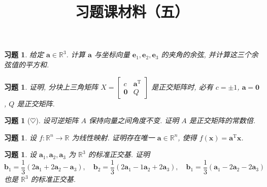 \documentclass[UTF8]{ctexart}
\newtheorem{ex}[thm]{习题}
\begin{document}
\title{习题课材料（五）}
\date{}

\maketitle


\begin{ex}
  给定 \(\boldsymbol{a} \in \mathbb{R}^3\).
  计算 \(\boldsymbol{a}\) 与坐标向量 \(\boldsymbol{e}_1,\boldsymbol{e}_2,\boldsymbol{e}_3\)
  的夹角的余弦, 并计算这三个余弦值的平方和.
\end{ex}



\begin{ex}
  证明, 分块上三角矩阵
  \(X=\begin{bmatrix} c & \boldsymbol{a}^{\mathrm{T}} \\ \boldsymbol{0} & Q\end{bmatrix}\)
  是正交矩阵时, 必有 \(c = \pm 1\), \(\boldsymbol{a} = \boldsymbol{0}\),
  \(Q\) 是正交矩阵.
\end{ex}



\begin{ex}[\(\heartsuit\)]
  设可逆矩阵 \(A\) 保持向量之间角度不变.
  证明 \(A\) 是正交矩阵的常数倍.
\end{ex}



\begin{ex}
 设 \(f\colon \mathbb{R}^n \to \mathbb{R}\)
  为线性映射. 证明存在唯一 \(\boldsymbol{a} \in \mathbb{R}^n\),
  使得 \(f(\boldsymbol{x}) = \boldsymbol{a}^{\mathrm{T}}\boldsymbol{x}\).
\end{ex}



\begin{ex}
  设 \(\boldsymbol{a}_1, \boldsymbol{a}_2, \boldsymbol{a}_3\)
  为 \(\mathbb{R}^3\) 的标准正交基.
  证明
  \begin{equation*}
    \boldsymbol{b}_1 = \frac{1}{3}(2\boldsymbol{a}_1 + 2\boldsymbol{a}_2 - \boldsymbol{a}_3), \quad
    \boldsymbol{b}_2 = \frac{1}{3}(2\boldsymbol{a}_1 - 1\boldsymbol{a}_2 + 2\boldsymbol{a}_3), \quad
    \boldsymbol{b}_1 = \frac{1}{3}(\boldsymbol{a}_1 - 2\boldsymbol{a}_2 - 2\boldsymbol{a}_3)
  \end{equation*}
  也是 \(\mathbb{R}^3\) 的标准正交基.
\end{ex}
\end{document}
